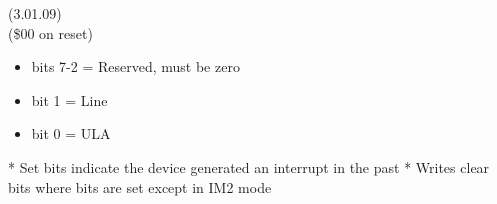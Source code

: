 (3.01.09)\\
(\$00 on reset)
\begin{itemize}
\item bits 7-2 = Reserved, must be zero
\item bit 1 = Line
\item bit 0 = ULA
\end{itemize}
* Set bits indicate the device generated an interrupt in the past
* Writes clear bits where bits are set except in IM2 mode



